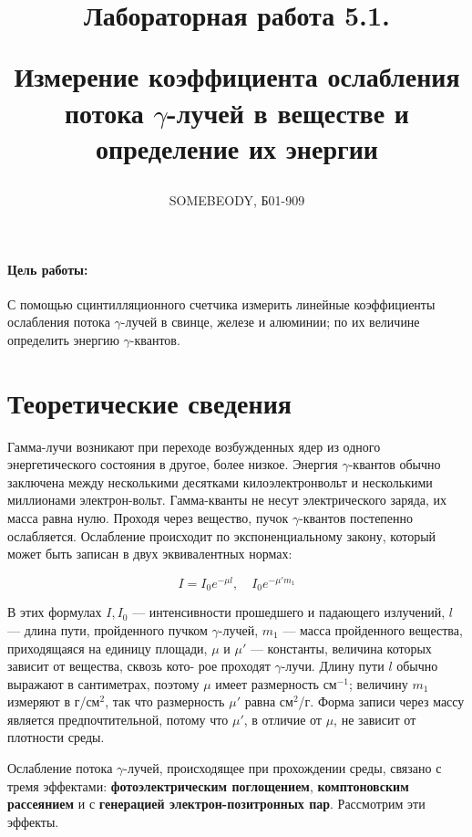 \documentclass[a5paper, 10pt, twoside]{article} %
\title
{\hfill \break  \hfill \break
\hfill \break  \hfill \break
Лабораторная работа 5.1.

Измерение коэффициента ослабления потока $\gamma$-лучей в веществе и определение
их энергии}
\author{SOMEBEODY, Б01-909}
\begin{document}
\maketitle


\thispagestyle{empty} %

\newpage

\tableofcontents %
\thispagestyle{plain}
\newpage


\paragraph{Цель работы:}

С помощью сцинтилляционного счетчика измерить линейные коэффициенты ослабления
потока $\gamma$-лучей в свинце, железе и алюминии; по их величине определить
энергию $\gamma$-квантов.

\section{Теоретические сведения}

Гамма-лучи возникают при переходе возбужденных ядер из одного энергетического
состояния в другое, более низкое. Энергия $ \gamma $-квантов обычно заключена
между несколькими десятками килоэлектронвольт и несколькими миллионами
электрон-вольт. Гамма-кванты не несут электрического заряда, их масса равна
нулю. Проходя через вещество, пучок $ \gamma $-квантов постепенно ослабляется.
Ослабление происходит по экспоненциальному закону, который может быть записан в
двух эквивалентных нормах:

\begin{equation}\label{I(mu)}
I = I_0 e^{-\mu l}, \quad I_0 e^{-\mu 'm_1}
\end{equation}

В этих формулах $ I, I_0 $ --- интенсивности прошедшего и падающего излучений,
$ l $ --- длина пути, пройденного пучком $\gamma$-лучей, $ m_1 $ --- масса
пройденного вещества, приходящаяся на единицу площади, $ \mu $ и $ \mu' $ ---
константы, величина которых зависит от вещества, сквозь кото- рое проходят
$\gamma$-лучи. Длину пути $ l $ обычно выражают в сантиметрах, поэтому $ \mu $
имеет размерность см$ ^{-1} $; величину $ m_1 $ измеряют в г/см$ ^2 $, так что
размерность $ \mu' $ равна см$ ^2 $/г. Форма записи через массу является
предпочтительной, потому что $ \mu' $, в отличие от $ \mu $, не зависит от
плотности среды.

Ослабление потока $\gamma$-лучей, происходящее при прохождении среды, связано
с тремя эффектами: \textbf{фотоэлектрическим поглощением},
\textbf{комптоновским рассеянием} и с \textbf{генерацией электрон-позитронных
пар}. Рассмотрим эти эффекты.
\end{document}
